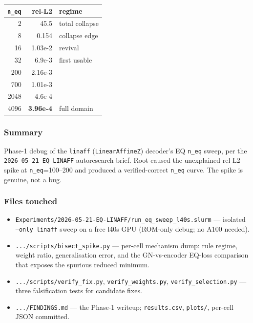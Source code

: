 \begin{center}
\begin{tabular}{r r l}
  \textbf{\texttt{n\_eq}} & \textbf{rel-L2} & \textbf{regime} \\
  \hline
  2    & 45.5      & total collapse \\
  8    & 0.154     & collapse edge \\
  16   & 1.03e-2   & revival \\
  32   & 6.9e-3    & first usable \\
  200  & 2.16e-3   & \\
  700  & 1.01e-3   & \\
  2048 & 4.6e-4    & \\
  4096 & \textbf{3.96e-4} & full domain \\
\end{tabular}
\end{center}



\subsubsection*{Summary}
Phase-1 debug of the \texttt{linaff} (\texttt{LinearAffineZ}) decoder's
EQ \texttt{n\_eq} sweep, per the \texttt{2026-05-21-EQ-LINAFF}
autoresearch brief. Root-caused the unexplained rel-L2 spike at
\texttt{n\_eq}=100--200 and produced a verified-correct \texttt{n\_eq}
curve. The spike is genuine, not a bug.

\subsubsection*{Files touched}
\begin{itemize}
  \item \texttt{Experiments/2026-05-21-EQ-LINAFF/run\_eq\_sweep\_l40s.slurm} --- isolated \texttt{--only linaff} sweep on a free l40s GPU (ROM-only debug; no A100 needed).
  \item \texttt{.../scripts/bisect\_spike.py} --- per-cell mechanism dump: rule regime, weight ratio, generalisation error, and the GN-vs-encoder EQ-loss comparison that exposes the spurious reduced minimum.
  \item \texttt{.../scripts/verify\_fix.py}, \texttt{verify\_weights.py}, \texttt{verify\_selection.py} --- three falsification tests for candidate fixes.
  \item \texttt{.../FINDINGS.md} --- the Phase-1 writeup; \texttt{results.csv}, \texttt{plots/}, per-cell JSON committed.
\end{itemize}

